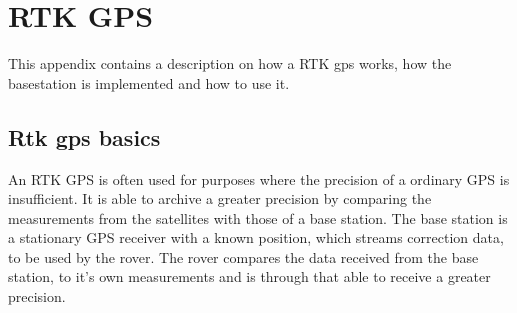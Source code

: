 \chapter{RTK GPS}\label{app:rtk_gps}
This appendix contains a description on how a RTK gps works, how the basestation is implemented and how to use it.


\section{Rtk gps basics}

An RTK GPS is often used for purposes where the precision of a ordinary GPS is insufficient.
It is able to archive a greater precision by comparing the measurements from the satellites with those of a base station.
The base station is a stationary GPS receiver with a known position, which streams correction data, to be used by the rover. 
The rover compares the data received from the base station, to it's own measurements and is through that able to receive a greater precision.


